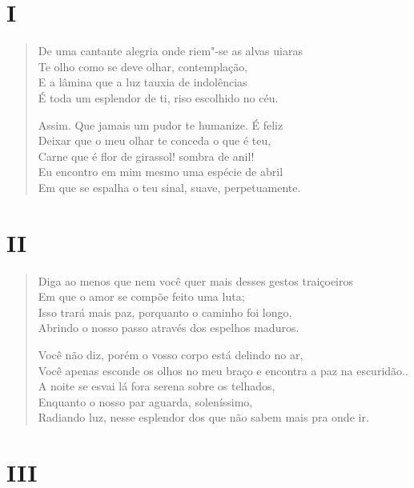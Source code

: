 \section*{I}

\begin{verse}
De uma cantante alegria onde riem"-se as alvas uiaras\\
Te olho como se deve olhar, contemplação,\\
E a lâmina que a luz tauxia de indolências\\
É toda um esplendor de ti, riso escolhido no céu.

Assim. Que jamais um pudor te humanize. É feliz\\
Deixar que o meu olhar te conceda o que é teu,\\
Carne que é flor de girassol! sombra de anil!\\
Eu encontro em mim mesmo uma espécie de abril\\
Em que se espalha o teu sinal, suave, perpetuamente.
\end{verse}

\medskip
\section*{II}

\begin{verse}
Diga ao menos que nem você quer mais desses gestos traiçoeiros\\
Em que o amor se compõe feito uma luta;\\
Isso trará mais paz, porquanto o caminho foi longo,\\
Abrindo o nosso passo através dos espelhos maduros.

Você não diz, porém o vosso corpo está delindo no ar,\\
Você apenas esconde os olhos no meu braço e encontra a paz na escuridão..\\
A noite se esvai lá fora serena sobre os telhados,\\
Enquanto o nosso par aguarda, soleníssimo,\\
Radiando luz, nesse esplendor dos que não sabem mais pra onde ir.
\end{verse}

\medskip
\section*{III}

